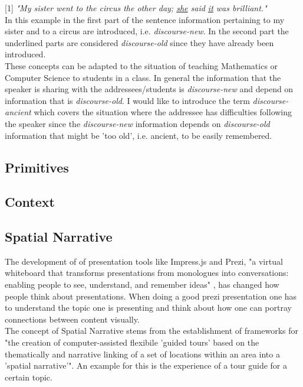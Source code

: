 \documentclass[twoside]{article}
\begin{document}
[1] \textit{"My sister went to the circus the other day; \underline{she} said \underline{it} was brilliant."}\\

In this example in the first part of the sentence information pertaining to my sister and to a circus are introduced, i.e. \textit{discourse-new}. In the second part the underlined parts are considered \textit{discourse-old} since they have already been introduced.\\

These concepts can be adapted to the situation of teaching Mathematics or Computer Science to students in a class. In general the information that the speaker is sharing with the addressees/students is \textit{discourse-new} and depend on  information that is \textit{discourse-old}. I would like to introduce the term \textit{discourse-ancient} which covers the situation where the addressee has difficulties following the speaker since the \textit{discourse-new} information depends on \textit{discourse-old} information that might be 'too old', i.e. ancient, to be easily remembered.\\

\subsection{Primitives}

\subsection{Context}


\subsection{Spatial Narrative}
The development of of presentation tools like Impress.js and Prezi, "a virtual whiteboard that transforms presentations from monologues into conversations: enabling people to see, understand, and remember ideas" \cite{Prezi:npentrel14}, has  changed how people think about presentations. When doing a good prezi presentation one has to understand the topic one is presenting and think about how one can portray connections between content visually.\\

The concept of Spatial Narrative \cite{SpatialNarratives:npentrel14} stems from the establishment of frameworks for "the creation of computer-assisted flexibile 'guided tours' based on the thematically and narrative linking of a set of locations within an area into a 'spatial narrative'". An example for this is the experience of a tour guide for a certain topic.\\
\end{document}
